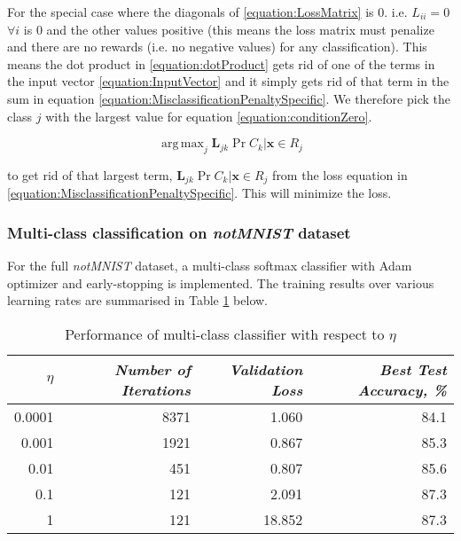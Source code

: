 \documentclass[a4paper,12pt]{article}
\DeclareMathOperator*{\argmax}{arg\,max}
\begin{document}
For the special case where the diagonals of \ref{equation:LossMatrix} is 0. i.e. $L_{ii} = 0$ $\forall i$  is 0 and the other values positive (this means the loss matrix must penalize and there are no rewards (i.e. no negative values) for any classification). This means the dot product in \ref{equation:dotProduct} gets rid of one of the terms in the input vector \ref{equation:InputVector} and it simply gets rid of that term in the sum in equation \ref{equation:MisclassificationPenaltySpecific}. We therefore pick the class $j$ with the largest value for equation \ref{equation:conditionZero}. 

\begin{equation}
\label{equation:conditionZero}
\argmax_j \mathbf{L}_{jk} \Pr{C_{k} | \mathbf{x} \in R_{j}} 
\end{equation}

to get rid of that largest term, $\mathbf{L}_{jk} \Pr{C_{k} | \mathbf{x} \in R_{j}}$ from 
the loss equation in \ref{equation:MisclassificationPenaltySpecific}. This will minimize the loss. 

\clearpage
\subsubsection{Multi-class classification on \textit{notMNIST} dataset}

For the full \textit{notMNIST} dataset, a multi-class softmax classifier with Adam optimizer and early-stopping is implemented. The training results over various learning rates are summarised in Table \ref{table:SoftmaxResult} below.

\begin{table}[!htb]
\centering
\caption{Performance of multi-class classifier with respect to $\eta$}
\label{table:SoftmaxResult}
\vspace{0.5em}
\begin{tabular}{|r|r r r|} \hline
$\eta$ & \textit{Number of Iterations} & \textit{Validation Loss} & \textit{Best Test Accuracy, \%} \\ \hline
0.0001 & 8371 & 1.060 & 84.1 \\
0.001 & 1921 & 0.867 & 85.3 \\
0.01 & 451 & 0.807 & 85.6 \\
0.1 & 121 & 2.091 & 87.3 \\
1 & 121 & 18.852 & 87.3 \\
\hline
\end{tabular}
\end{table}
\end{document}

